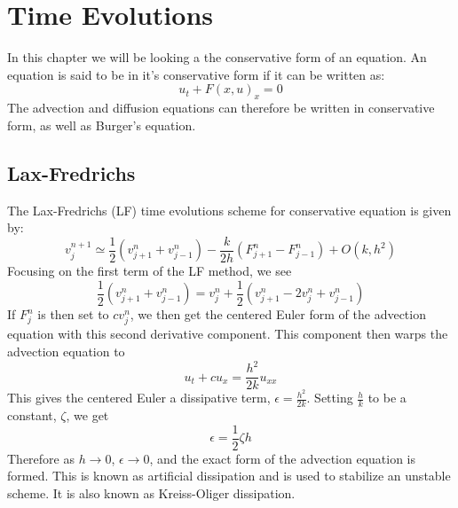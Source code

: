 \chapter{Time Evolutions}
In this chapter we will be looking a the conservative form of an equation. An equation is said to be in it's conservative form if it can be written as:
\begin{equation*}
  u_t + F(x,u)_x = 0
\end{equation*}
The advection and diffusion equations can therefore be written in conservative form, as well as Burger's equation.
\section{Lax-Fredrichs}
The Lax-Fredrichs (LF) time evolutions scheme for conservative equation is given by:
\begin{equation*}
  v^{n+1}_j \simeq \frac{1}{2}(v^n_{j+1} + v^n_{j-1}) - \frac{k}{2h}(F^n_{j+1}-F^n_{j-1}) + O(k,h^2)
\end{equation*}
Focusing on the first term of the LF method, we see 
\begin{equation*}
  \frac{1}{2}(v^n_{j+1} + v^n_{j-1}) = v^n_j + \frac{1}{2}(v^n_{j+1} - 2v^n_j + v^n_{j-1})
\end{equation*}
If $F^n_j$ is then set to $cv^n_j$, we then get the centered Euler form of the advection equation with this second derivative component. This component then warps the advection equation to 
\begin{equation*}
 u_t + cu_x = \frac{h^2}{2k}u_{xx}
\end{equation*}
This gives the centered Euler a dissipative term, $\epsilon = \frac{h^2}{2k}$. Setting $\frac{h}{k}$ to be a constant, $\zeta$, we get
\begin{equation*}
  \epsilon = \frac{1}{2}\zeta h
\end{equation*}
Therefore as $h\rightarrow 0$, $\epsilon\rightarrow0$, and the exact form of the advection equation is formed. This is known as artificial dissipation and is used to stabilize an unstable scheme. It is also known as Kreiss-Oliger dissipation.
